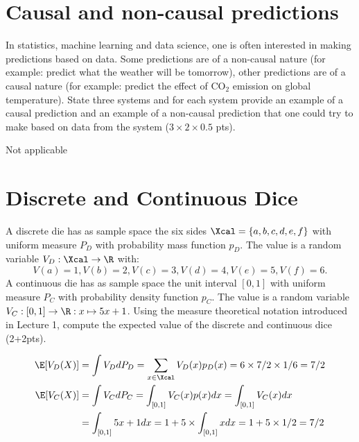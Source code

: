 \section{Causal and non-causal predictions}
In statistics, machine learning and data science, one is often interested in making predictions based on data.
Some predictions are of a non-causal nature (for example: predict what the weather will be tomorrow),
other predictions are of a causal nature (for example: predict the effect of CO$_2$ emission on global temperature).
State three systems and for each system provide an example of a causal prediction and an example of a non-causal prediction that one could try to make based on data from the system ($3 \times 2 \times 0.5$ pts).

\begin{gradedsolution}
Not applicable
\end{gradedsolution}

\section{Discrete and Continuous Dice}
A discrete die has as sample space the six sides $\Xcal=\{a, b, c, d, e, f\}$ with uniform measure $P_D$ with probability mass function $p_D$. The value is a random variable $V_D:\Xcal \to \R$ with:
\[
    V(a)=1, V(b)=2, V(c)=3, V(d)=4, V(e)=5, V(f)=6.
\]
A continuous die has as sample space the unit interval $[0, 1]$ with uniform measure $P_C$ with probability density function $p_C$. The value is a random variable $V_C:[0,1] \to \R : x \mapsto 5 x + 1$. Using the measure theoretical notation introduced in Lecture 1, compute the expected value of the discrete and continuous dice (2+2pts).

\begin{gradedsolution}
\begin{align*}
    \E[V_D(X)]&=\int V_D dP_D= \sum_{x \in \Xcal}V_D(x)p_D(x)=6 \times 7/2 \times 1/6 = 7/2\\
    \E[V_C(X)]&=\int V_C dP_C= \int_{[0,1]}V_C(x)p(x)dx=\int_{[0,1]}V_C(x)dx \\
    &=\int_{[0,1]}5x+1dx=1+5 \times \int_{[0,1]}x dx = 1 + 5 \times 1/2=7/2
\end{align*}

\end{gradedsolution}


